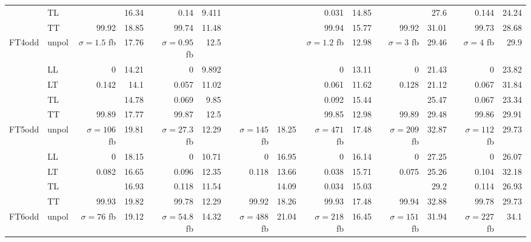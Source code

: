 \begin{table}[h]
{\begin{tabular}{llrrrrrrrrrrrr}
 & TL &  & \num{16.34} & \num{0.14} & \num{9.411} &  &  & \num{0.031} & \num{14.85} &  & \num{27.6} & \num{0.144} & \num{24.24} \\
 & TT & \num{99.92} & \num{18.85} & \num{99.74} & \num{11.48} &  &  & \num{99.94} & \num{15.77} & \num{99.92} & \num{31.01} & \num{99.73} & \num{28.68} \\
\midrule
\multirow{5}{*}{FT4odd}
 & unpol & $\sigma = \num{1.5}$ fb & \num{17.76} & $\sigma = \num{0.95}$ fb & \num{12.5} &  &  & $\sigma = \num{1.2}$ fb & \num{12.98} & $\sigma = \num{3}$ fb & \num{29.46} & $\sigma = \num{4}$ fb & \num{29.9} \\
 & LL & \num{0} & \num{14.21} & \num{0} & \num{9.892} &  &  & \num{0} & \num{13.11} & \num{0} & \num{21.43} & \num{0} & \num{23.82} \\
 & LT & \num{0.142} & \num{14.1} & \num{0.057} & \num{11.02} &  &  & \num{0.061} & \num{11.62} & \num{0.128} & \num{21.12} & \num{0.067} & \num{31.84} \\
 & TL &  & \num{14.78} & \num{0.069} & \num{9.85} &  &  & \num{0.092} & \num{15.44} &  & \num{25.47} & \num{0.067} & \num{23.34} \\
 & TT & \num{99.89} & \num{17.77} & \num{99.87} & \num{12.5} &  &  & \num{99.85} & \num{12.98} & \num{99.89} & \num{29.48} & \num{99.86} & \num{29.91} \\
\midrule
\multirow{5}{*}{FT5odd}
 & unpol & $\sigma = \num{106}$ fb & \num{19.81} & $\sigma = \num{27.3}$ fb & \num{12.29} & $\sigma = \num{145}$ fb & \num{18.25} & $\sigma = \num{471}$ fb & \num{17.48} & $\sigma = \num{209}$ fb & \num{32.87} & $\sigma = \num{112}$ fb & \num{29.73} \\
 & LL & \num{0} & \num{18.15} & \num{0} & \num{10.71} & \num{0} & \num{16.95} & \num{0} & \num{16.14} & \num{0} & \num{27.25} & \num{0} & \num{26.07} \\
 & LT & \num{0.082} & \num{16.65} & \num{0.096} & \num{12.35} & \num{0.118} & \num{13.66} & \num{0.038} & \num{15.71} & \num{0.075} & \num{25.26} & \num{0.104} & \num{32.18} \\
 & TL &  & \num{16.93} & \num{0.118} & \num{11.54} &  & \num{14.09} & \num{0.034} & \num{15.03} &  & \num{29.2} & \num{0.114} & \num{26.93} \\
 & TT & \num{99.93} & \num{19.82} & \num{99.78} & \num{12.29} & \num{99.92} & \num{18.26} & \num{99.93} & \num{17.48} & \num{99.94} & \num{32.88} & \num{99.78} & \num{29.73} \\
\midrule
\multirow{5}{*}{FT6odd}
 & unpol & $\sigma = \num{76}$ fb & \num{19.12} & $\sigma = \num{54.8}$ fb & \num{14.32} & $\sigma = \num{488}$ fb & \num{21.04} & $\sigma = \num{218}$ fb & \num{16.45} & $\sigma = \num{151}$ fb & \num{31.94} & $\sigma = \num{227}$ fb & \num{34.1} \\

\end{tabular}}
\end{table}
